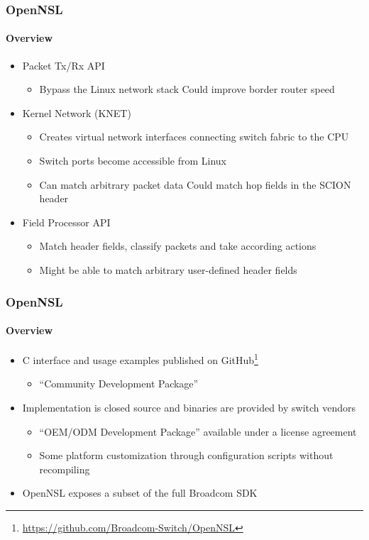 \documentclass[12pt]{beamer}
\begin{document}
\begin{frame}
\frametitle{OpenNSL}
\framesubtitle{Overview}
\begin{itemize}
    \item Packet Tx/Rx API
    \begin{itemize}
        \item Bypass the Linux network stack \textrightarrow Could improve border router speed
    \end{itemize}
    \pause
    \item Kernel Network (KNET)
    \begin{itemize}
        \item Creates virtual network interfaces connecting switch fabric to the CPU
        \item Switch ports become accessible from Linux
        \item Can match arbitrary packet data \textrightarrow Could match hop fields in the SCION header
    \end{itemize}
    \pause
    \item Field Processor API
    \begin{itemize}
        \item Match header fields, classify packets and take according actions
        \item Might be able to match arbitrary user-defined header fields
    \end{itemize}
\end{itemize}
\end{frame}

\begin{frame}
\frametitle{OpenNSL}
\framesubtitle{Overview}
\begin{itemize}
    \item C interface and usage examples published on GitHub\footnote{\url{https://github.com/Broadcom-Switch/OpenNSL}}
    \begin{itemize}
    	\item ``Community Development Package''
    \end{itemize}
    \item Implementation is closed source and binaries are provided by switch vendors
    \begin{itemize}
    	\item ``OEM/ODM Development Package'' available under a license agreement
    	\item Some platform customization through configuration scripts without recompiling
    \end{itemize}
    \item OpenNSL exposes a subset of the full Broadcom SDK
\end{itemize}
\end{frame}
\end{document}
